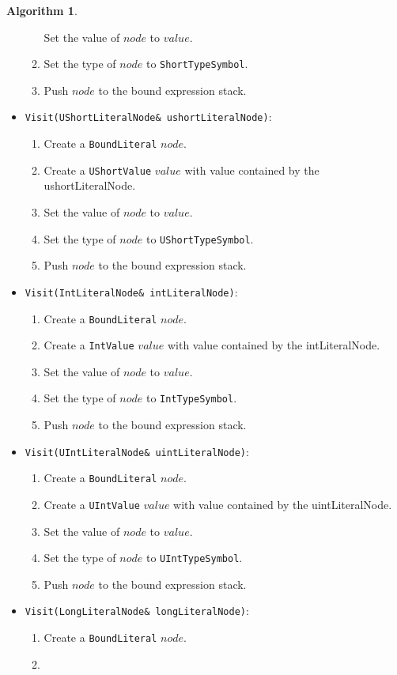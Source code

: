 \documentclass[a4paper,oneside,11pt]{book}
\theoremstyle{definition}
\newtheorem{algo}{Algorithm}[section]
\begin{document}
\begin{algo}
\begin{itemize}
\begin{enumerate}
Set the value of $node$ to $value$.
\item
Set the type of $node$ to \verb|ShortTypeSymbol|.
\item
Push $node$ to the bound expression stack.
\end{enumerate}
\item
\verb|Visit(UShortLiteralNode& ushortLiteralNode)|:
\begin{enumerate}
\item
Create a \verb|BoundLiteral| $node$.
\item
Create a \verb|UShortValue| $value$ with value contained by the ushortLiteralNode.
\item
Set the value of $node$ to $value$.
\item
Set the type of $node$ to \verb|UShortTypeSymbol|.
\item
Push $node$ to the bound expression stack.
\end{enumerate}
\item
\verb|Visit(IntLiteralNode& intLiteralNode)|:
\begin{enumerate}
\item
Create a \verb|BoundLiteral| $node$.
\item
Create a \verb|IntValue| $value$ with value contained by the intLiteralNode.
\item
Set the value of $node$ to $value$.
\item
Set the type of $node$ to \verb|IntTypeSymbol|.
\item
Push $node$ to the bound expression stack.
\end{enumerate}
\item
\verb|Visit(UIntLiteralNode& uintLiteralNode)|:
\begin{enumerate}
\item
Create a \verb|BoundLiteral| $node$.
\item
Create a \verb|UIntValue| $value$ with value contained by the uintLiteralNode.
\item
Set the value of $node$ to $value$.
\item
Set the type of $node$ to \verb|UIntTypeSymbol|.
\item
Push $node$ to the bound expression stack.
\end{enumerate}
\item
\verb|Visit(LongLiteralNode& longLiteralNode)|:
\begin{enumerate}
\item
Create a \verb|BoundLiteral| $node$.
\item

\end{enumerate}
\end{itemize}
\end{algo}
\end{document}
